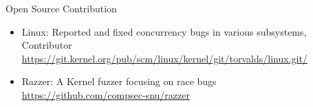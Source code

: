 \begin{rSection}{Open Source Contribution}
  \begin{itemize}
  \item Linux: Reported and fixed concurrency bugs in various subsystems, Contributor\\
    \url{https://git.kernel.org/pub/scm/linux/kernel/git/torvalds/linux.git/}
  \item Razzer: A Kernel fuzzer focusing on race bugs\\
    \url{https://github.com/compsec-snu/razzer}
  \end{itemize}
\end{rSection}